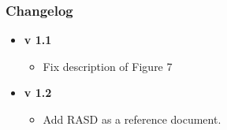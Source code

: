 \documentclass[11pt]{article} %
\begin{document}
\subsubsection{Changelog}

\begin{itemize}[noitemsep]
	\item \textbf{v 1.1}
	\begin{itemize}[noitemsep]
		\item Fix description of Figure 7
	\end{itemize}

	\item \textbf{v 1.2}
	\begin{itemize}[noitemsep]
		\item Add RASD as a reference document.
	\end{itemize}
\end{itemize}
\end{document}
